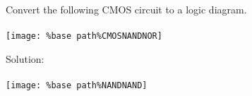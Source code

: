 Convert the following CMOS circuit to a logic diagram.\\ \\
\texttt{[image: \%base path\%CMOSNANDNOR]}

Solution: \\ \\
\texttt{[image: \%base path\%NANDNAND]}
